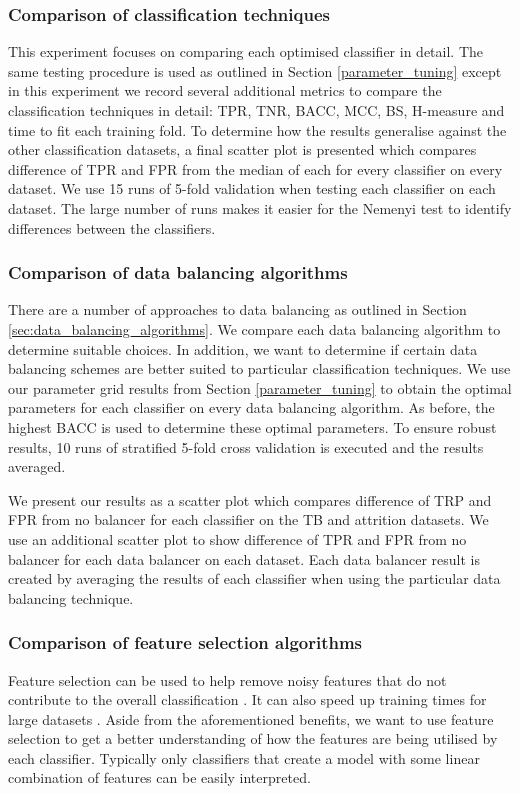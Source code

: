 \documentclass{sig-alternate-05-2015}
\begin{document}
	\subsubsection{Comparison of classification techniques}
	\label{comparision_of_classification_technique}
	This experiment focuses on comparing each optimised classifier in detail. The same testing procedure is used as outlined in Section \ref{parameter_tuning} except in this experiment we record several additional metrics to compare the classification techniques in detail: TPR, TNR, BACC, MCC, BS, H-measure and time to fit each training fold. To determine how the results generalise against the other classification datasets, a final scatter plot is presented which compares difference of TPR and FPR from the median of each for every classifier on every dataset. We use 15 runs of 5-fold validation when testing each classifier on each dataset. The large number of runs makes it easier for the Nemenyi test to identify differences between the classifiers.
	
	\subsubsection{Comparison of data balancing algorithms}
	There are a number of approaches to data balancing as outlined in Section \ref{sec:data_balancing_algorithms}. We compare each data balancing algorithm to determine suitable choices. In addition, we want to determine if certain data balancing schemes are better suited to particular classification techniques. We use our parameter grid results from Section \ref{parameter_tuning} to obtain the optimal parameters for each classifier on every data balancing algorithm. As before, the highest BACC is used to determine these optimal parameters. To ensure robust results, 10 runs of stratified 5-fold cross validation is executed and the results averaged.
	
	We present our results as a scatter plot which compares difference of TRP and FPR from no balancer for each classifier on the TB and attrition datasets. We use an additional scatter plot to show difference of TPR and FPR from no balancer for each data balancer on each dataset. Each data balancer result is created by averaging the results of each classifier when using the particular data balancing technique.
	
	\subsubsection{Comparison of feature selection algorithms}
	Feature selection can be used to help remove noisy features that do not contribute to the overall classification \cite{Guyon:2003:IVF:944919.944968}. It can also speed up training times for large datasets \cite{Guyon:2003:IVF:944919.944968}. Aside from the aforementioned benefits, we want to use feature selection to get a better understanding of how the features are being utilised by each classifier. Typically only classifiers that create a model with some linear combination of features can be easily interpreted.
	
\end{document}
